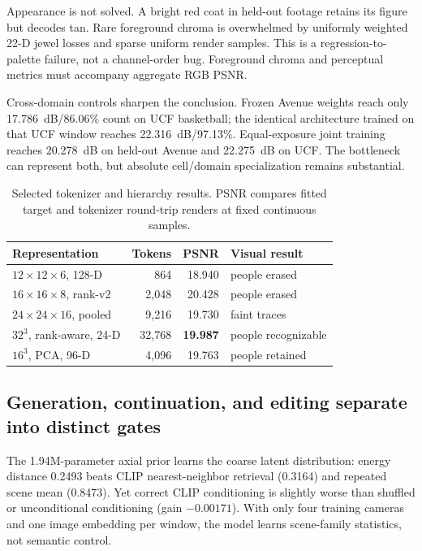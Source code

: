 \documentclass[10pt]{article}
\begin{document}
Appearance is not solved. A bright red coat in held-out footage retains its figure but decodes tan.
Rare foreground chroma is overwhelmed by uniformly weighted 22-D jewel losses and sparse uniform
render samples. This is a regression-to-palette failure, not a channel-order bug. Foreground chroma
and perceptual metrics must accompany aggregate RGB PSNR.

Cross-domain controls sharpen the conclusion. Frozen Avenue weights reach only
\SI{17.786}{dB}/86.06\% count on UCF basketball; the identical architecture trained on that UCF
window reaches \SI{22.316}{dB}/97.13\%. Equal-exposure joint training reaches
\SI{20.278}{dB} on held-out Avenue and \SI{22.275}{dB} on UCF. The bottleneck can represent both,
but absolute cell/domain specialization remains substantial.

\begin{table}[H]
\centering
\small
\caption{Selected tokenizer and hierarchy results. PSNR compares fitted target and tokenizer
round-trip renders at fixed continuous samples.}
\label{tab:tokenizer}
\begin{tabularx}{\linewidth}{@{}XrrX@{}}
\toprule
Representation & Tokens & PSNR & Visual result \\
\midrule
$12\times12\times6$, 128-D & 864 & 18.940 & people erased \\
$16\times16\times8$, rank-v2 & 2,048 & 20.428 & people erased \\
$24\times24\times16$, pooled & 9,216 & 19.730 & faint traces \\
$32^3$, rank-aware, 24-D & 32,768 & \textbf{19.987} & people recognizable \\
$16^3$, PCA, 96-D & 4,096 & 19.763 & people retained \\
\bottomrule
\end{tabularx}
\end{table}

\subsection{Generation, continuation, and editing separate into distinct gates}

The 1.94M-parameter axial prior learns the coarse latent distribution: energy distance 0.2493 beats
CLIP nearest-neighbor retrieval (0.3164) and repeated scene mean (0.8473). Yet correct CLIP
conditioning is slightly worse than shuffled or unconditional conditioning (gain $-0.00171$).
With only four training cameras and one image embedding per window, the model learns scene-family
statistics, not semantic control.
\end{document}

